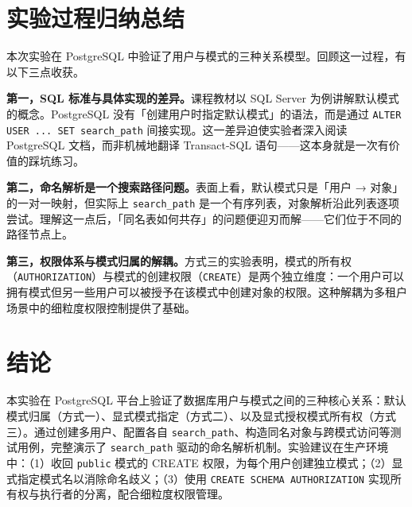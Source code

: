 \documentclass[12pt, a4paper]{academics}
\begin{document}
\section{实验过程归纳总结}

本次实验在 PostgreSQL 中验证了用户与模式的三种关系模型。回顾这一过程，有以下三点收获。

\textbf{第一，SQL 标准与具体实现的差异。}课程教材以 SQL Server 为例讲解默认模式的概念。PostgreSQL 没有「创建用户时指定默认模式」的语法，而是通过 \texttt{ALTER USER ... SET search\_path} 间接实现。这一差异迫使实验者深入阅读 PostgreSQL 文档，而非机械地翻译 Transact-SQL 语句——这本身就是一次有价值的踩坑练习。

\textbf{第二，命名解析是一个搜索路径问题。}表面上看，默认模式只是「用户 → 对象」的一对一映射，但实际上 \texttt{search\_path} 是一个有序列表，对象解析沿此列表逐项尝试。理解这一点后，「同名表如何共存」的问题便迎刃而解——它们位于不同的路径节点上。

\textbf{第三，权限体系与模式归属的解耦。}方式三的实验表明，模式的所有权（\texttt{AUTHORIZATION}）与模式的创建权限（\texttt{CREATE}）是两个独立维度：一个用户可以拥有模式但另一些用户可以被授予在该模式中创建对象的权限。这种解耦为多租户场景中的细粒度权限控制提供了基础。

\section{结论}
\label{sec:conclusion}

本实验在 PostgreSQL 平台上验证了数据库用户与模式之间的三种核心关系：默认模式归属（方式一）、显式模式指定（方式二）、以及显式授权模式所有权（方式三）。通过创建多用户、配置各自 \texttt{search\_path}、构造同名对象与跨模式访问等测试用例，完整演示了 \texttt{search\_path} 驱动的命名解析机制。实验建议在生产环境中：（1）收回 \texttt{public} 模式的 CREATE 权限，为每个用户创建独立模式；（2）显式指定模式名以消除命名歧义；（3）使用 \texttt{CREATE SCHEMA AUTHORIZATION} 实现所有权与执行者的分离，配合细粒度权限管理。
\end{document}
